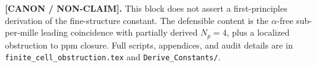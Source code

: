             \textbf{[CANON / NON-CLAIM].}
            This block does not assert a first-principles derivation of the fine-structure
            constant. The defensible content is the $\alpha$-free sub-per-mille leading
            coincidence with partially derived $N_p=4$, plus a localized obstruction to
            ppm closure. Full scripts, appendices, and audit details are in
            \texttt{finite\_cell\_obstruction.tex} and \texttt{Derive\_Constants/}.
